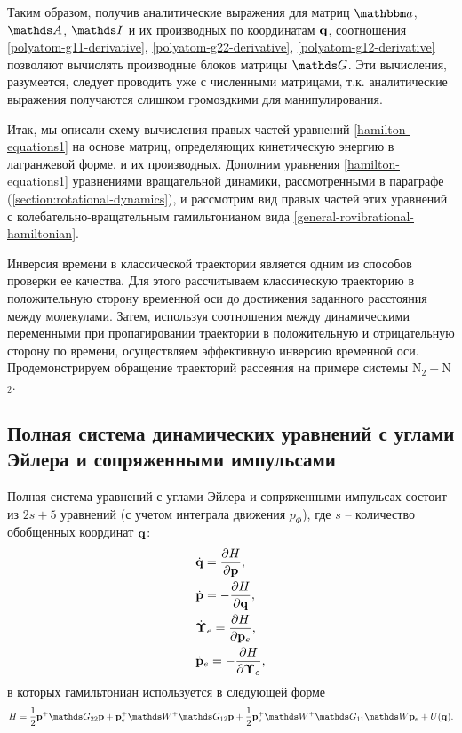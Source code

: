 Таким образом, получив аналитические выражения для матриц $\bba$, $\bbA$, $\bbI$ и их производных по координатам $\mathbf{q}$, соотношения \eqref{polyatom-g11-derivative}, \eqref{polyatom-g22-derivative}, \eqref{polyatom-g12-derivative} позволяют вычислять производные блоков матрицы $\bbG$. Эти вычисления, разумеется, следует проводить уже с численными матрицами, т.к. аналитические выражения получаются слишком громоздкими для манипулирования. \par
Итак, мы описали схему вычисления правых частей уравнений \eqref{hamilton-equations1} на основе матриц, определяющих кинетическую энергию в лагранжевой форме, и их производных. Дополним уравнения \eqref{hamilton-equations1} уравнениями вращательной динамики, рассмотренными в параграфе (\ref{section:rotational-dynamics}), и рассмотрим вид правых частей этих уравнений с колебательно-вращательным гамильтонианом вида \eqref{general-rovibrational-hamiltonian}. \par
Инверсия времени в классической траектории является одним из способов проверки ее качества. Для этого рассчитываем классическую траекторию в положительную сторону временной оси до достижения заданного расстояния между молекулами. Затем, используя соотношения между динамическими переменными при пропагировании траектории в положительную и отрицательную сторону по времени, осуществляем эффективную инверсию временной оси. Продемонстрируем обращение траекторий рассеяния на примере системы N$_2-$N$_2$. 

\subsection{Полная система динамических уравнений с углами Эйлера и сопряженными импульсами}
    Полная система уравнений с углами Эйлера и сопряженными импульсах состоит из $2s + 5$ уравнений (с учетом интеграла движения $p_\Phi$), где $s$ -- количество обобщенных координат $\mathbf{q}$:
\begin{gather}
    \begin{aligned}
        &\dot{\mathbf{q}} = \frac{\partial H}{\partial \mathbf{p}}, \\
        &\dot{\mathbf{p}} = -\frac{\partial H}{\partial \mathbf{q}}, \\
        &\dot{\boldsymbol{\Upsilon}}_e = \frac{\partial H}{\partial \mathbf{p}_e}, \\
        &\dot{\mathbf{p}}_e = - \frac{\partial H}{\partial \boldsymbol{\Upsilon}_e},
    \end{aligned} \label{full-system-euler}
\end{gather}
%
в которых гамильтониан используется в следующей форме
\begin{gather}
    H = \frac{1}{2} \mf{p}^+ \bbG_{22} \mf{p} + \mf{p}^+_e \bbW^+ \bbG_{12} \mf{p} + \frac{1}{2} \mf{p}^+_e \bbW^+ \bbG_{11} \bbW \pe + U(\mf{q}). \label{general-rovibrational-hamiltonian-euler}
\end{gather}

